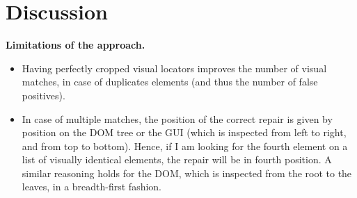 \section{Discussion}\label{sec:discussion}

\textbf{Limitations of the approach.} 

\begin{itemize}
\item Having perfectly cropped visual locators improves the number of visual matches, in case of duplicates elements (and thus the number of false positives).
\item In case of multiple matches, the position of the correct repair is given by position on the DOM tree or the GUI (which is inspected from left to right, and from top to bottom). Hence, if I am looking for the fourth element on a list of visually identical elements, the repair will be in fourth position. A similar reasoning holds for the DOM, which is inspected from the root to the leaves, in a breadth-first fashion.
\end{itemize}

